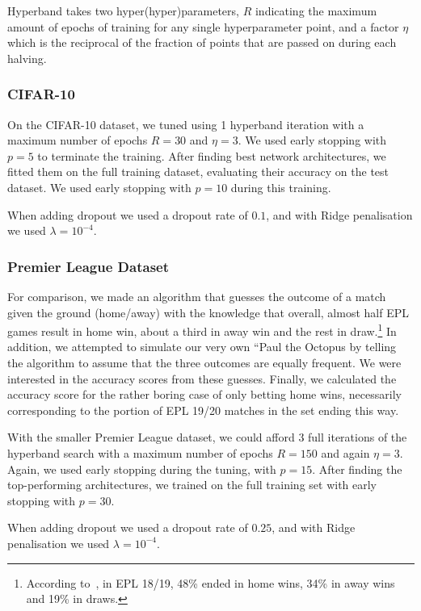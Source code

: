         Hyperband takes two hyper(hyper)parameters, $R$ indicating the maximum amount of epochs of training for any single hyperparameter point, and a factor $\eta$ which is the reciprocal of the fraction of points that are passed on during each halving.


    \subsubsection{CIFAR-10}
        On the CIFAR-10 dataset, we tuned using 1 hyperband iteration with a maximum number of epochs $R=30$ and $\eta=3$. We used early stopping with $p=5$ to terminate the training. After finding best network architectures, we fitted them on the full training dataset, evaluating their accuracy on the test dataset. We used early stopping with $p=10$ during this training.

        When adding dropout we used a dropout rate of $0.1$, and with Ridge penalisation we used $\lambda=10^{-4}$.

    \subsubsection{Premier League Dataset}
        For comparison, we made an algorithm that guesses the outcome of a match given the ground (home/away) with the knowledge that overall, almost half EPL games result in home win, about a third in away win and the rest in draw.\footnote{According to~\citep{SoccerSTATS}, in EPL 18/19, 48\% ended in home wins, 34\% in away wins and 19\% in draws.} In addition, we attempted to simulate our very own ``Paul the Octopus \citep{PaulTheOctopus} by telling the algorithm to assume that the three outcomes are equally frequent. We were interested in the accuracy scores from these guesses. Finally, we calculated the accuracy score for the rather boring case of only betting home wins, necessarily corresponding to the portion of EPL 19/20 matches in the set ending this way. 

        With the smaller Premier League dataset, we could afford 3 full iterations of the hyperband search with a maximum number of epochs $R=150$ and again $\eta=3$. Again, we used early stopping during the tuning, with $p=15$. After finding the top-performing architectures, we trained on the full training set with early stopping with $p=30$.

        When adding dropout we used a dropout rate of $0.25$, and with Ridge penalisation we used $\lambda=10^{-4}$.
